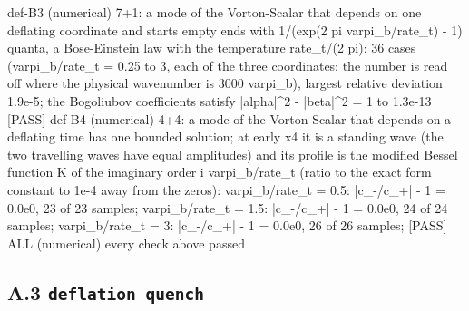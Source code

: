 \documentclass[
  10pt,
]{article}
\newenvironment{Shaded}{}{}
\newcommand{\NormalTok}[1]{#1}
\begin{document}
\begin{Shaded}
\begin{Highlighting}[]
\NormalTok{[PASS] def{-}B3  (numerical) 7+1: a mode of the Vorton{-}Scalar that depends on one deflating coordinate and starts empty ends with 1/(exp(2 pi varpi\_b/rate\_t) {-} 1) quanta, a Bose{-}Einstein law with the temperature rate\_t/(2 pi): 36 cases (varpi\_b/rate\_t = 0.25 to 3, each of the three coordinates; the number is read off where the physical wavenumber is 3000 varpi\_b), largest relative deviation 1.9e{-}5; the Bogoliubov coefficients satisfy |alpha|\^{}2 {-} |beta|\^{}2 = 1 to 1.3e{-}13}
\NormalTok{[PASS] def{-}B4  (numerical) 4+4: a mode of the Vorton{-}Scalar that depends on a deflating time has one bounded solution; at early x4 it is a standing wave (the two travelling waves have equal amplitudes) and its profile is the modified Bessel function K of the imaginary order i varpi\_b/rate\_t (ratio to the exact form constant to 1e{-}4 away from the zeros): varpi\_b/rate\_t = 0.5: |c\_{-}/c\_+| {-} 1 = 0.0e0, 23 of 23 samples; varpi\_b/rate\_t = 1.5: |c\_{-}/c\_+| {-} 1 = 0.0e0, 24 of 24 samples; varpi\_b/rate\_t = 3: |c\_{-}/c\_+| {-} 1 = 0.0e0, 26 of 26 samples;}
\NormalTok{[PASS] ALL  (numerical) every check above passed}
\end{Highlighting}
\end{Shaded}

\hypertarget{a.3-deflation-quench}{%
\subsection{\texorpdfstring{A.3
\texttt{deflation\ quench}}{A.3 deflation quench}}\label{a.3-deflation-quench}}
\end{document}
